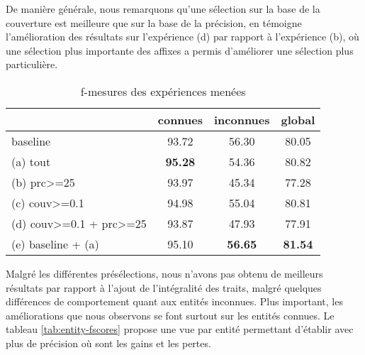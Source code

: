 \documentclass[PhD-Yoann-Dupont.tex]{subfiles}
\begin{document}
De manière générale, nous remarquons qu'une sélection sur la base de la couverture est meilleure que sur la base de la précision, en témoigne l'amélioration des résultats sur l'expérience (d) par rapport à l'expérience (b), où une sélection plus importante des affixes a permis d'améliorer une sélection plus particulière.

\begin{table}[ht!]
\centering
\begin{tabular}{|l|ccc|}
\cline{2-4}
\multicolumn{1}{l|}{}   & connues        & inconnues      & global \\
\hline
baseline                & 93.72          & 56.30          & 80.05 \\
\hline
(a) tout                & \textbf{95.28} & 54.36          & 80.82 \\
\hline
(b) prc>=25             & 93.97          & 45.34          & 77.28 \\
(c) couv>=0.1           & 94.98          & 55.04          & 80.81 \\
(d) couv>=0.1 + prc>=25 & 93.87          & 47.93          & 77.91 \\
\hline
(e) baseline + (a)          & 95.10          & \textbf{56.65} & \textbf{81.54} \\
\hline
\end{tabular}
\caption{f-mesures des expériences menées}
\label{tab:fscores}
\end{table}

Malgré les différentes présélections, nous n'avons pas obtenu de meilleurs résultats par rapport à l'ajout de l'intégralité des traits, malgré quelques différences de comportement quant aux entités inconnues. Plus important, les améliorations que nous observons se font surtout sur les entités connues. Le tableau \ref{tab:entity-fscores} propose une vue par entité permettant d'établir avec plus de précision où sont les gains et les pertes.
\end{document}

